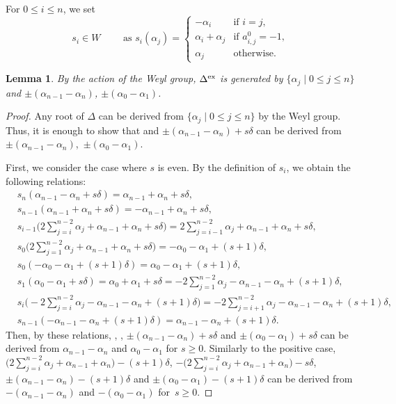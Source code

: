 \documentclass[pdftex]{sigma}
\numberwithin{equation}{section}
\newtheorem{Lemma}[Theorem]{Lemma}
\theoremstyle{definition}
\begin{document}
For $0\leq i\leq n$, we set
\[ s_i\in W \qquad \text{ as } s_i(\alpha_j)=\begin{cases}
-\alpha_i&\text{if }i=j,\\
\alpha_i+\alpha_j&\text{if }a^0_{i,j}=-1,\\
\alpha_j&\text{otherwise.}
\end{cases}
\]
\begin{Lemma}%
By the action of the Weyl group, $\Delta^{{\rm ex}}$ is generated by $\{\alpha_j\mid0\leq j\leq n\}$ and $\pm(\alpha_{n-1}-\alpha_n)$, $\pm(\alpha_0-\alpha_1)$.
\end{Lemma}
\begin{proof}
Any root of $\Delta$ can be derived from $\{\alpha_j\mid0\leq j\leq n\}$ by the Weyl group. Thus, it is enough to show that  and $\pm(\alpha_{n-1}-\alpha_n)+s\delta$ can be derived from~$\pm(\alpha_{n-1}-\alpha_n)$,~$\pm(\alpha_0-\alpha_1)$.

First, we consider the case where $s$ is even.
By the definition of $s_i$, we obtain the following relations:
\begin{align*}
&s_n(\alpha_{n-1}-\alpha_n+s\delta)=\alpha_{n-1}+\alpha_n+s\delta,\\
&s_{n-1}(\alpha_{n-1}+\alpha_n+s\delta)=-\alpha_{n-1}+\alpha_n+s\delta,\\
&s_{i-1}\Biggl(2\sum_{j=i}^{n-2}\alpha_j+\alpha_{n-1}+\alpha_n+s\delta\Biggr)=2\sum_{j=i-1}^{n-2}\alpha_j+\alpha_{n-1}+\alpha_n+s\delta,\\
&s_{0}\Biggl(2\sum_{j=1}^{n-2}\alpha_j+\alpha_{n-1}+\alpha_n+s\delta\Biggr)=-\alpha_{0}-\alpha_1+(s+1)\delta,\\
&s_0(-\alpha_{0}-\alpha_1+(s+1)\delta)=\alpha_{0}-\alpha_1+(s+1)\delta,\\
&s_1(\alpha_0-\alpha_1+s\delta)=\alpha_{0}+\alpha_1+s\delta=-2\sum_{j=1}^{n-2}\alpha_j-\alpha_{n-1}-\alpha_n+(s+1)\delta,\\
&s_{i}\Biggl(-2\sum_{j=i}^{n-2}\alpha_j-\alpha_{n-1}-\alpha_n+(s+1)\delta\Biggr)=-2\sum_{j=i+1}^{n-2}\alpha_j-\alpha_{n-1}-\alpha_n+(s+1)\delta,\\
&s_{n-1}(-\alpha_{n-1}-\alpha_n+(s+1)\delta)=\alpha_{n-1}-\alpha_n+(s+1)\delta.
\end{align*}
Then, by these relations, , , $\pm(\alpha_{n-1}-\alpha_n)+s\delta$ and $\pm(\alpha_0-\alpha_1)+s\delta$ can be derived from $\alpha_{n-1}-\alpha_n$ and $\alpha_0-\alpha_1$ for $s\geq0$.
Similarly to the positive case, $\bigl(2\sum_{j=i}^{n-2}\alpha_j+\alpha_{n-1}+\alpha_n\bigr)-(s+1)\delta$, $-\bigl(2\sum_{j=i}^{n-2}\alpha_j+\alpha_{n-1}+\alpha_n\bigr)-s\delta$, $\pm(\alpha_{n-1}-\alpha_n)-(s+1)\delta$ and $\pm(\alpha_0-\alpha_1)-(s+1)\delta$ can be derived from $-(\alpha_{n-1}-\alpha_n)$ and $-(\alpha_0-\alpha_1)$ for~${s\geq0}$.
\end{proof}
\end{document}
